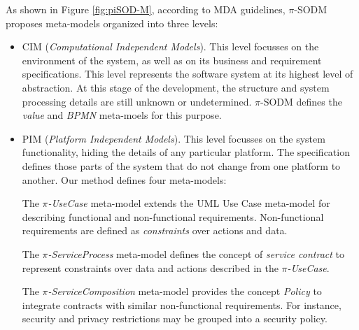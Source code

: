 As shown in Figure \ref{fig:piSOD-M}, according to MDA guidelines, $\pi$-SODM proposes meta-models  organized into three levels: 
\begin{itemize}
\item CIM (\textit{Computational Independent Models}). This level focusses on the
environment of the system, as well as on its business and requirement specifications.
This level represents the software system at its highest level of abstraction.
At this stage of the development, the structure and system processing details are still unknown or undetermined.  $\pi$-SODM defines the \textit{value}
and \textit{BPMN} meta-moels for this purpose. 

 \item PIM (\textit{Platform Independent Models}). This level focusses on the system functionality, hiding the details of any particular platform.
The specification defines those parts of the system that do not change from one platform to another. Our method defines four meta-models: 

 The \textit{$\pi$-UseCase} meta-model extends the UML Use Case meta-model for describing functional and non-functional requirements. Non-functional requirements are defined as \textit{constraints} over actions and data.
 
The \textit{$\pi$-ServiceProcess} meta-model defines the concept of \textit{service contract} to represent constraints over data and actions 
described in the \textit{$\pi$-UseCase}.

The \textit{$\pi$-ServiceComposition} meta-model provides the concept  \textit{Policy}
to integrate contracts with similar non-functional requirements.
For instance, security and privacy restrictions may be grouped into a security policy.
 

\end{itemize}
